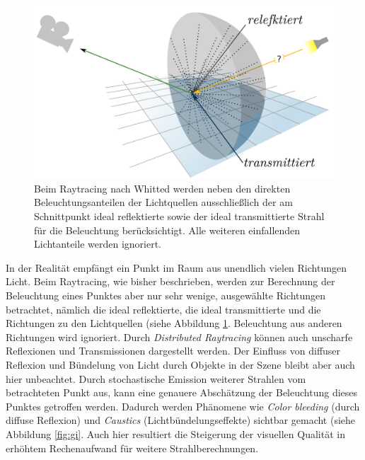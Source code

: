 \begin{figure}\center
\includegraphics[width=.6\textwidth]{images/refrareflect.pdf}
\caption[Auswahl der Beleuchtungsfaktoren]{Beim Raytracing nach Whitted werden neben den direkten Beleuchtungsanteilen der Lichtquellen ausschließlich der am Schnittpunkt ideal reflektierte sowie der ideal transmittierte Strahl für die Beleuchtung berücksichtigt. Alle weiteren einfallenden Lichtanteile werden ignoriert.}
\label{fig:whitted}
\end{figure}

In der Realität empfängt ein Punkt im Raum aus unendlich vielen Richtungen Licht. Beim Raytracing, wie bisher beschrieben, werden zur Berechnung der Beleuchtung eines Punktes aber nur sehr wenige, ausgewählte Richtungen betrachtet, nämlich die ideal reflektierte, die ideal transmittierte und die Richtungen zu den Lichtquellen (siehe Abbildung \ref{fig:whitted}. Beleuchtung aus anderen Richtungen wird ignoriert. Durch \textit{Distributed Raytracing} können auch unscharfe Reflexionen und Transmissionen dargestellt werden. Der Einfluss von diffuser Reflexion und Bündelung von Licht durch Objekte in der Szene bleibt aber auch hier unbeachtet.
Durch stochastische Emission weiterer Strahlen vom betrachteten Punkt aus, kann eine genauere Abschätzung der Beleuchtung dieses Punktes getroffen werden. Dadurch werden Phänomene wie \textit{Color bleeding} (durch diffuse Reflexion) und \textit{Caustics} (Lichtbündelungseffekte) sichtbar gemacht (siehe Abbildung \ref{fig:gi}. Auch hier resultiert die Steigerung der visuellen Qualität in erhöhtem Rechenaufwand für weitere Strahlberechnungen.


